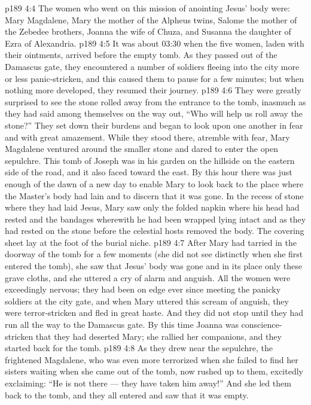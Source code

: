 \vs p189 4:4 The women who went on this mission of anointing Jesus’ body were: Mary Magdalene, Mary the mother of the Alpheus twins, Salome the mother of the Zebedee brothers, Joanna the wife of Chuza, and Susanna the daughter of Ezra of Alexandria.
\vs p189 4:5 It was about 03:30 when the five women, laden with their ointments, arrived before the empty tomb. As they passed out of the Damascus gate, they encountered a number of soldiers fleeing into the city more or less panic\hyp{}stricken, and this caused them to pause for a few minutes; but when nothing more developed, they resumed their journey.
\vs p189 4:6 They were greatly surprised to see the stone rolled away from the entrance to the tomb, inasmuch as they had said among themselves on the way out, “Who will help us roll away the stone?” They set down their burdens and began to look upon one another in fear and with great amazement. While they stood there, atremble with fear, Mary Magdalene ventured around the smaller stone and dared to enter the open sepulchre. This tomb of Joseph was in his garden on the hillside on the eastern side of the road, and it also faced toward the east. By this hour there was just enough of the dawn of a new day to enable Mary to look back to the place where the Master’s body had lain and to discern that it was gone. In the recess of stone where they had laid Jesus, Mary saw only the folded napkin where his head had rested and the bandages wherewith he had been wrapped lying intact and as they had rested on the stone before the celestial hosts removed the body. The covering sheet lay at the foot of the burial niche.
\vs p189 4:7 After Mary had tarried in the doorway of the tomb for a few moments (she did not see distinctly when she first entered the tomb), she saw that Jesus’ body was gone and in its place only these grave cloths, and she uttered a cry of alarm and anguish. All the women were exceedingly nervous; they had been on edge ever since meeting the panicky soldiers at the city gate, and when Mary uttered this scream of anguish, they were terror\hyp{}stricken and fled in great haste. And they did not stop until they had run all the way to the Damascus gate. By this time Joanna was conscience\hyp{}stricken that they had deserted Mary; she rallied her companions, and they started back for the tomb.
\vs p189 4:8 As they drew near the sepulchre, the frightened Magdalene, who was even more terrorized when she failed to find her sisters waiting when she came out of the tomb, now rushed up to them, excitedly exclaiming: “He is not there --- they have taken him away!” And she led them back to the tomb, and they all entered and saw that it was empty.
